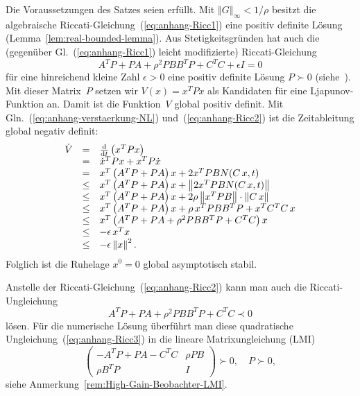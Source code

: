 \begin{svmultproof2}
Die Voraussetzungen des Satzes seien erfüllt. Mit $\left\Vert G\right\Vert _{\infty}<1/\rho$
besitzt die algebraische Riccati-Gleichung~(\ref{eq:anhang-Ricc1})
eine positiv definite Lösung (Lemma~\ref{lem:real-bounded-lemma}).
Aus Stetigkeitsgründen hat auch die (gegenüber Gl.~(\ref{eq:anhang-Ricc1})
leicht modifizierte) Riccati-Gleichung 
\begin{equation}
A^{T}P+PA+\rho^{2}PBB^{T}P+C^{T}C+\epsilon I=0\label{eq:anhang-Ricc2}
\end{equation}
für eine hinreichend kleine Zahl $\epsilon>0$ eine positiv definite
Lösung $P\succ0$ (siehe~\cite{rajamani1998}). Mit dieser Matrix~$P$
setzen wir $V(x)=x^{T}Px$ als Kandidaten für eine Ljapunov-Funktion
an. Damit ist die Funktion~$V$ global positiv definit. Mit Gln.~(\ref{eq:anhang-verstaerkung-NL})
und~(\ref{eq:anhang-Ricc2}) ist die Zeitableitung global negativ
definit:
\[
\begin{array}{lcl}
\dot{V} & = & \frac{{\mathrm{d}}}{{\mathrm{d}} t}\left(x^{T}Px\right)\\
 & = & \dot{x}^{T}Px+x^{T}P\dot{x}\\
 & = & x^{T}\left(A^{T}P+PA\right)x+2x^{T}PBN(C\,x,t)\\
 & \leq & x^{T}\left(A^{T}P+PA\right)x+\left\Vert 2x^{T}PBN(C\,x,t)\right\Vert \\
 & \leq & x^{T}\left(A^{T}P+PA\right)x+2\rho\left\Vert x^{T}PB\right\Vert \cdot\left\Vert C\,x\right\Vert \\
 & \leq & x^{T}\left(A^{T}P+PA\right)x+\rho\,x^{T}PBB^{T}P+x^{T}C^{T}C\,x\\
 & \leq & x^{T}\left(A^{T}P+PA+\rho^{2}PBB^{T}P+C^{T}C\right)x\\
 & \leq & -\epsilon\,x^{T}x\\
 & \leq & -\epsilon\left\Vert x\right\Vert ^{2}.
\end{array}
\]
Folglich ist die Ruhelage $x^{0}=0$ global asymptotisch stabil.
\end{svmultproof2}

Anstelle der Riccati-Gleichung~(\ref{eq:anhang-Ricc2}) kann man
auch die Riccati-Ungleichung 
\begin{equation}
A^{T}P+PA+\rho^{2}PBB^{T}P+C^{T}C\prec0\label{eq:anhang-Ricc3}
\end{equation}
lösen. Für die numerische Lösung überführt man diese quadratische
Ungleichung~(\ref{eq:anhang-Ricc3}) in die lineare Matrixungleichung
(LMI) 
\[
\left(\begin{array}{cc}
-A^{T}P+PA-C^{T}C & \rho PB\\
\rho B^{T}P & I
\end{array}\right)\succ0,\quad P\succ0,
\]
siehe Anmerkung~\ref{rem:High-Gain-Beobachter-LMI}.

